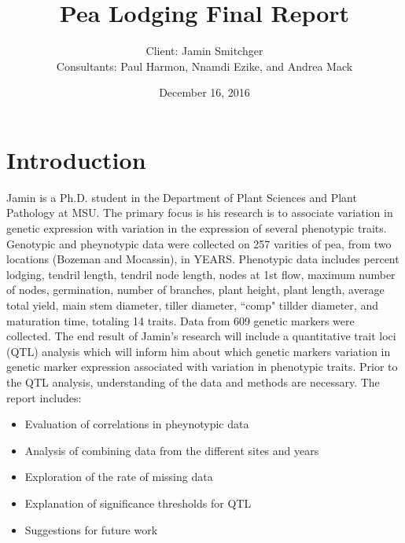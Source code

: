 \documentclass[11pt]{article}
\title{Pea Lodging Final Report}
\author{Client: Jamin Smitchger\\
Consultants: Paul Harmon, Nnamdi Ezike, and Andrea Mack}
\date{December 16, 2016}
\begin{document}
\maketitle





\section{Introduction}
Jamin is a Ph.D. student in the Department of Plant Sciences and Plant Pathology at MSU. The primary focus is his research is to associate variation in genetic expression with variation in the expression of several phenotypic traits. Genotypic and pheynotypic data were collected on 257 varities of pea, from two locations (Bozeman and Mocassin), in YEARS. Phenotypic data includes percent lodging, tendril length, tendril node length, nodes at 1st flow, maximum number of nodes, germination, number of branches, plant height, plant length, average total yield, main stem diameter, tiller diameter, ``comp" tillder diameter, and maturation time, totaling 14 traits. Data from 609 genetic markers were collected. The end result of Jamin's research will include a quantitative trait loci (QTL) analysis which will inform him about which genetic markers variation in genetic marker expression associated with variation in phenotypic traits. Prior to the QTL analysis, understanding of the data and methods are necessary. The report includes:

\begin{itemize}

\item Evaluation of correlations in pheynotypic data

\item Analysis of combining data from the different sites and years

\item Exploration of the rate of missing data

\item Explanation of significance thresholds for QTL 

\item Suggestions for future work
\end{itemize}
\end{document}
